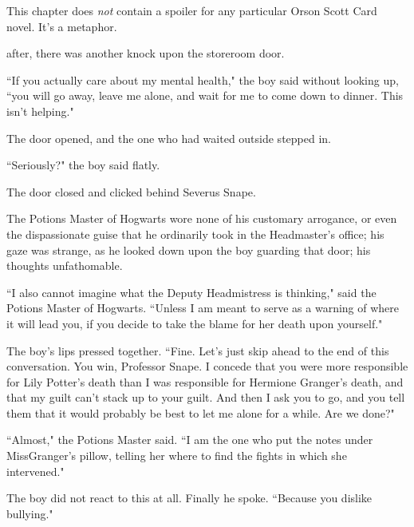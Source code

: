 
\begin{chapterOpeningAuthorNote}
This chapter does \emph{not} contain a spoiler for any particular Orson Scott Card novel. It's a metaphor.
\end{chapterOpeningAuthorNote}

 after, there was another knock upon the storeroom door.

\hplettrineextrapara
``If you actually care about my mental health," the boy said without looking up, ``you will go away, leave me alone, and wait for me to come down to dinner. This isn't helping."

The door opened, and the one who had waited outside stepped in.

``Seriously?" the boy said flatly.

The door closed and clicked behind Severus Snape.

The Potions Master of Hogwarts wore none of his customary arrogance, or even the dispassionate guise that he ordinarily took in the Headmaster's office; his gaze was strange, as he looked down upon the boy guarding that door; his thoughts unfathomable.

``I also cannot imagine what the Deputy Headmistress is thinking," said the Potions Master of Hogwarts. ``Unless I am meant to serve as a warning of where it will lead you, if you decide to take the blame for her death upon yourself."

The boy's lips pressed together. ``Fine. Let's just skip ahead to the end of this conversation. You win, Professor Snape. I concede that you were more responsible for Lily Potter's death than I was responsible for Hermione Granger's death, and that my guilt can't stack up to your guilt. And then I ask you to go, and you tell them that it would probably be best to let me alone for a while. Are we done?"

``Almost," the Potions Master said. ``I am the one who put the notes under Miss\?Granger's pillow, telling her where to find the fights in which she intervened."

The boy did not react to this at all. Finally he spoke. ``Because you dislike bullying."


